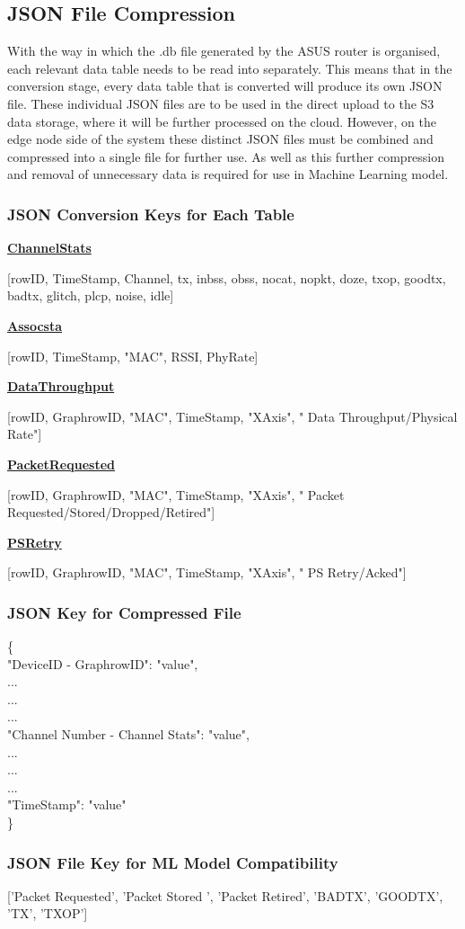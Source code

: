 \subsection{JSON File Compression}
\label{Section: JSON File Compression}


With the way in which the .db file generated by the ASUS router is organised, each relevant data table needs to be read into separately. This means that in the conversion stage, every data table that is converted will produce its own JSON file. These individual JSON files are to be used in the direct upload to the S3 data storage, where it will be further processed on the cloud. However, on the edge node side of the system these distinct JSON files must be combined and compressed into a single file for further use. As well as this further compression and removal of unnecessary data is required for use in Machine Learning model. 

\subsubsection{JSON Conversion Keys for Each Table}

\textbf{\underline{ChannelStats}}

[rowID, TimeStamp, Channel, tx, inbss, obss, nocat, nopkt, doze, txop, goodtx, badtx, glitch, plcp, noise, idle]

\textbf{\underline{Assocsta}}

[rowID, TimeStamp, "MAC", RSSI, PhyRate]

\textbf{\underline{DataThroughput}}

[rowID, GraphrowID, "MAC", TimeStamp, "XAxis", " Data Throughput/Physical Rate"]

\textbf{\underline{PacketRequested}}

[rowID, GraphrowID, "MAC", TimeStamp, "XAxis", " Packet Requested/Stored/Dropped/Retired"]

\textbf{\underline{PSRetry}}

[rowID, GraphrowID, "MAC", TimeStamp, "XAxis", " PS Retry/Acked"]

\subsubsection{JSON Key for Compressed File}
 
\{\\
"DeviceID - GraphrowID": "value",\\
...\\
...\\
...\\
"Channel Number - Channel Stats": "value",\\
...\\
...\\
...\\
"TimeStamp": "value"\\
\}

\subsubsection{JSON File Key for ML Model Compatibility}

['Packet Requested', 'Packet Stored ', 'Packet Retired', 'BADTX', 'GOODTX', 'TX', 'TXOP']


